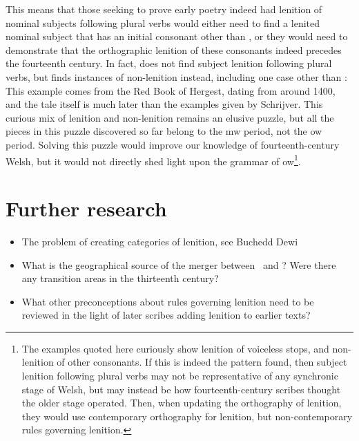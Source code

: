 This means that those seeking to prove early poetry indeed had lenition of nominal subjects following plural verbs would either need to find a lenited nominal subject that has an initial consonant other than , or they would need to demonstrate that the orthographic lenition of these consonants indeed precedes the fourteenth century. In fact, \textcite[65--66]{van_development14} does not find subject lenition following plural verbs, but finds instances of non-lenition instead, including one case other than :
This example comes from the Red Book of Hergest, dating from around 1400, and the tale itself is much later than the examples given by Schrijver. This curious mix of lenition and non-lenition remains an elusive puzzle, but all the pieces in this puzzle discovered so far belong to the \gls{mw} period, not the \gls{ow} period. Solving this puzzle would improve our knowledge of fourteenth-century Welsh, but it would not directly shed light upon the grammar of \gls{ow}\footnote{The examples quoted here curiously show lenition of voiceless stops, and non-lenition of other consonants. If this is indeed the pattern found, then subject lenition following plural verbs may not be representative of any synchronic stage of Welsh, but may instead be how fourteenth-century scribes thought the older stage operated. Then, when updating the orthography of lenition, they would use contemporary orthography for lenition, but non-contemporary rules governing lenition.}.

\section{Further research}
\label{sec:further-research}
\begin{itemize}
\item The problem of creating categories of lenition, see Buchedd Dewi
\item What is the geographical source of the merger between \lT\ and \xD? Were there any transition areas in the thirteenth century?
\item What other preconceptions about rules governing lenition need to be reviewed in the light of later scribes adding lenition to earlier texts?
\end{itemize}


